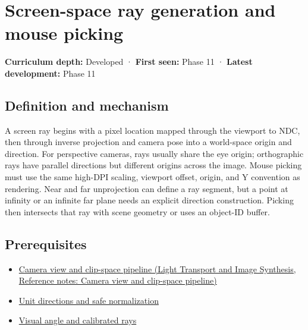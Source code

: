 \hypertarget{appendix-f1a6d43e80d1}{}\label{referencestart:appendix-f1a6d43e80d1}
\section{Screen-space ray generation and mouse picking}\label{appendix-f1a6d43e80d1-screen-space-ray-generation-and-mouse-picking}

\textbf{Curriculum depth:} Developed · \textbf{First seen:} Phase 11 · \textbf{Latest development:} Phase 11

\begin{allmightroledefinition}

\subsection{Definition and mechanism}\label{appendix-f1a6d43e80d1-definition-and-mechanism}

A screen ray begins with a pixel location mapped through the viewport to NDC, then through inverse projection and camera pose into a world-space origin and direction. For perspective cameras, rays usually share the eye origin; orthographic rays have parallel directions but different origins across the image. Mouse picking must use the same high-DPI scaling, viewport offset, origin, and Y convention as rendering. Near and far unprojection can define a ray segment, but a point at infinity or an infinite far plane needs an explicit direction construction. Picking then intersects that ray with scene geometry or uses an object-ID buffer.

\end{allmightroledefinition}

\subsection{Prerequisites}\label{appendix-f1a6d43e80d1-prerequisites}

\begin{itemize}
\tightlist
\item
  \href{../04-Light-Transport-and-Image-Synthesis/main.pdf\#nameddest=appendix-1c07d64f5e70}{Camera view and clip-space pipeline (Light Transport and Image Synthesis, Reference notes: Camera view and clip-space pipeline)}
\item
  \hyperref[appendix-f744e41b95b4]{Unit directions and safe normalization}
\item
  \hyperref[appendix-7d356c396d1a]{Visual angle and calibrated rays}
\end{itemize}

